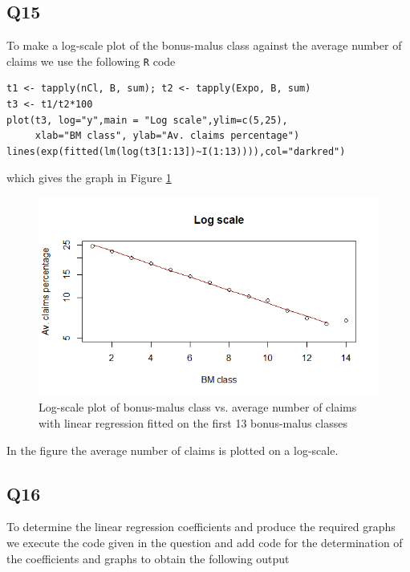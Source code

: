 \documentclass[11pt]{article}
\begin{document}
\subsection*{Q15}
To make a log-scale plot of the bonus-malus class against the average number of claims we use the following \verb|R| code
\begin{verbatim}
t1 <- tapply(nCl, B, sum); t2 <- tapply(Expo, B, sum)
t3 <- t1/t2*100
plot(t3, log="y",main = "Log scale",ylim=c(5,25),
     xlab="BM class", ylab="Av. claims percentage")
lines(exp(fitted(lm(log(t3[1:13])~I(1:13)))),col="darkred")
\end{verbatim}
which gives the graph in Figure \ref{Figure_Question15}
\begin{center}
\begin{figure}[H]

\includegraphics[scale=0.8]{Q15_LogScalePlot.png}

\caption{Log-scale plot of bonus-malus class vs. average number of claims with linear regression fitted on the first 13 bonus-malus classes}
\label{Figure_Question15}

\end{figure}
\end{center}

In the figure the average number of claims is plotted on a log-scale.


\subsection*{Q16}

To determine the linear regression coefficients and produce the required graphs we execute the code given in the question and add code for the determination of the coefficients and graphs to obtain the following output
\end{document}
